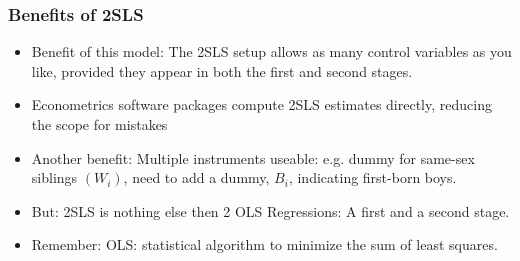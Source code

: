 \documentclass{beamer}
\begin{document}

\begin{frame}
\frametitle{Benefits of 2SLS}

\begin{itemize}
	\item Benefit of this model: The 2SLS setup allows as many control variables as you like, provided they appear in both the first and second stages.
	\item Econometrics software packages compute 2SLS estimates directly, reducing the scope for mistakes
	\item Another benefit: Multiple instruments useable: e.g. dummy for same-sex siblings $(W_i)$, need to add a dummy, $B_i$, indicating first-born boys.
	\item But: 2SLS is nothing else then 2 OLS Regressions: A first and a second stage.
	\item Remember: OLS: statistical algorithm to minimize the sum of least squares.
\end{itemize}
\end{frame}
\end{document}

